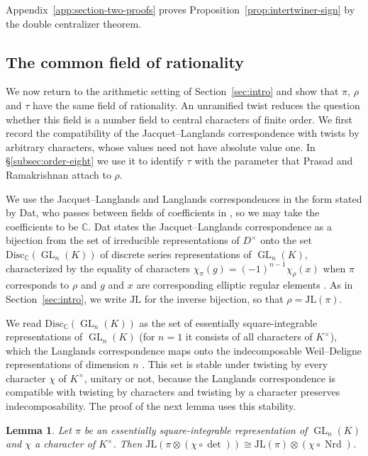 \documentclass[a4paper,11pt]{amsart}
\newtheorem{lemma}[theorem]{Lemma}
\theoremstyle{definition}
\theoremstyle{remark}
\numberwithin{equation}{section}
\DeclareMathOperator{\GL}{GL}
\newcommand{\C}{\mathbb{C}}
\newcommand{\JL}{\mathrm{JL}}
\DeclareMathOperator{\Nrd}{Nrd}
\begin{document}
Appendix~\ref{app:section-two-proofs} proves Proposition~\ref{prop:intertwiner-sign} by the double centralizer theorem.

\subsection{The common field of rationality}\label{subsec:common-rationality-field}

We now return to the arithmetic setting of Section~\ref{sec:intro} and show that $\pi$, $\rho$ and $\tau$ have the same field of rationality. An unramified twist reduces the question whether this field is a number field to central characters of finite order. We first record the compatibility of the Jacquet--Langlands correspondence with twists by arbitrary characters, whose values need not have absolute value one. In \S\ref{subsec:order-eight} we use it to identify $\tau$ with the parameter that Prasad and Ramakrishnan attach to $\rho$.

We use the Jacquet--Langlands and Langlands correspondences in the form stated by Dat, who passes between fields of coefficients in \cite[\S\S2.1.1--2.2.5]{Dat07}, so we may take the coefficients to be $\C$. Dat states the Jacquet--Langlands correspondence as a bijection from the set of irreducible representations of $D^\times$ onto the set $\mathrm{Disc}_\C(\GL_n(K))$ of discrete series representations of $\GL_n(K)$, characterized by the equality of characters $\chi_\pi(g)=(-1)^{n-1}\chi_\rho(x)$ when $\pi$ corresponds to $\rho$ and $g$ and $x$ are corresponding elliptic regular elements \cite[Th\'eor\`eme~2.1.2]{Dat07}. As in Section~\ref{sec:intro}, we write $\JL$ for the inverse bijection, so that $\rho=\JL(\pi)$.

We read $\mathrm{Disc}_\C(\GL_n(K))$ as the set of essentially square-integrable representations of $\GL_n(K)$ (for $n=1$ it consists of all characters of $K^\times$), which the Langlands correspondence maps onto the indecomposable Weil--Deligne representations of dimension $n$ \cite[2.2.7]{Dat07}. This set is stable under twisting by every character $\chi$ of $K^\times$, unitary or not, because the Langlands correspondence is compatible with twisting by characters \cite[\S2.2.1]{Dat07} and twisting by a character preserves indecomposability. The proof of the next lemma uses this stability.

\begin{lemma}\label{lem:jl-twist}
Let $\pi$ be an essentially square-integrable representation of $\GL_n(K)$ and $\chi$ a character of $K^\times$. Then $\JL(\pi\otimes(\chi\circ\det))\cong\JL(\pi)\otimes(\chi\circ\Nrd)$.
\end{lemma}
\end{document}
